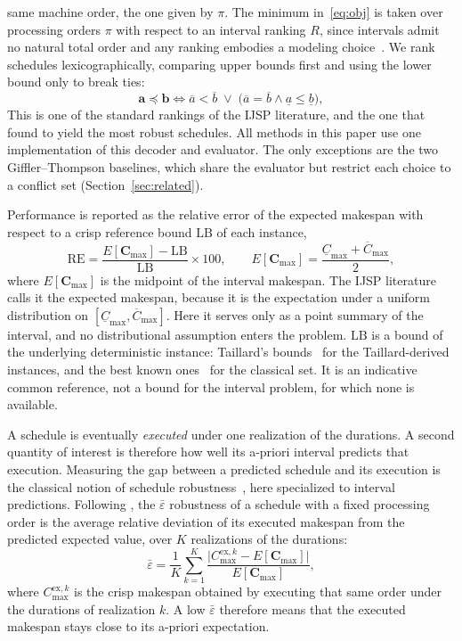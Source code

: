 \documentclass[preprint,number,sort&compress,12pt]{elsarticle}
\newcommand{\RE}{\mathrm{RE}}
\newcommand{\LB}{\mathrm{LB}}
\begin{document}
same machine order, the one given by $\pi$. The minimum
in~\eqref{eq:obj} is taken over processing orders $\pi$ with respect
to an interval ranking $R$,
since intervals admit no natural total order and any ranking embodies a
modeling choice~\citep{Ishibuchi1990}. We rank schedules
lexicographically, comparing upper bounds first and using the lower
bound only to break ties:
\begin{equation}
\mathbf{a} \preceq \mathbf{b} \iff \overline{a} < \overline{b}
\;\vee\; \big(\overline{a} = \overline{b} \wedge
\underline{a} \le \underline{b}\big),
\label{eq:rank}
\end{equation}
This is one of the standard rankings of the IJSP literature, and the one
that \citet{DiazGA2020} found to yield the most robust schedules. All
methods in this paper use one implementation of this decoder and
evaluator. The only exceptions are the two Giffler--Thompson baselines,
which share the evaluator but restrict each choice to a conflict set
(Section~\ref{sec:related}).

Performance is reported as the relative error of the expected makespan
with respect to a crisp reference bound $\LB$ of each instance,
\begin{equation}
\RE = \frac{E[\mathbf{C}_{\max}] - \LB}{\LB} \times 100,
\qquad
E[\mathbf{C}_{\max}] = \frac{\underline{C}_{\max} +
\overline{C}_{\max}}{2},
\end{equation}
where $E[\mathbf{C}_{\max}]$ is the midpoint of the interval
makespan. The IJSP literature calls it the expected makespan, because it
is the expectation under a uniform distribution on
$[\underline{C}_{\max},\overline{C}_{\max}]$. Here it serves only as a
point summary of the interval, and no distributional assumption enters
the problem. $\LB$ is a bound of the underlying deterministic instance:
Taillard's bounds~\citep{Taillard1993} for the Taillard-derived
instances, and the best known ones~\citep{DiazFEABC2023} for the
classical set. It is an indicative common reference, not a bound for the
interval problem, for which none is available.

A schedule is eventually \emph{executed} under one realization of the
durations. A second quantity of interest is therefore how well its
a-priori interval predicts that execution. Measuring the gap between a predicted
schedule and its execution is the classical notion of schedule
robustness~\citep{Leon1994}, here specialized to interval
predictions. Following \citet{DiazGA2020}, the
$\bar\varepsilon$ robustness of a schedule with a fixed processing order
is the average relative deviation of its executed makespan from the
predicted expected value, over $K$ realizations of the durations:
\begin{equation}
\bar\varepsilon = \frac{1}{K}\sum_{k=1}^{K}
\frac{\big|C^{\mathrm{ex},k}_{\max} - E[\mathbf{C}_{\max}]\big|}
     {E[\mathbf{C}_{\max}]},
\label{eq:eps}
\end{equation}
where $C^{\mathrm{ex},k}_{\max}$ is the crisp makespan obtained by executing that
same order under the durations of realization $k$. A low $\bar\varepsilon$ therefore means that the executed makespan
stays close to its a-priori expectation.
\end{document}
